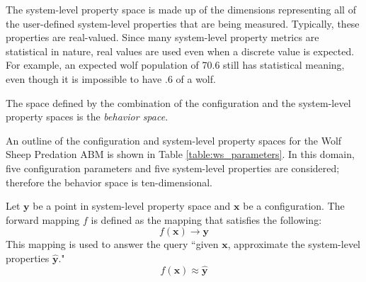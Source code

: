 The system-level property space is made up of the dimensions representing all of the user-defined system-level properties that are being measured.
Typically, these properties are real-valued.
Since many system-level property metrics are statistical in nature, real values are used even when a discrete value is expected.
For example, an expected wolf population of 70.6 still has statistical meaning, even though it is impossible to have .6 of a wolf.

The space defined by the combination of the configuration and the system-level property spaces is the \textit{behavior space}.

An outline of the configuration and system-level property spaces for the Wolf Sheep Predation ABM is shown in Table \ref{table:ws_parameters}.
In this domain, five configuration parameters and five system-level properties are considered; therefore the behavior space is ten-dimensional.


Let $\mathbf{y}$ be a point in system-level property space and $\mathbf x$ be a configuration.
The forward mapping $f$ is defined as the mapping that satisfies the following:
\[ f(\mathbf x) \rightarrow \mathbf{y} \]
This mapping is used to answer the query ``given $\mathbf x$, approximate the system-level properties  $\hat{\mathbf y}$."
\[ f(\mathbf x) \approx \hat{\mathbf y} \]




